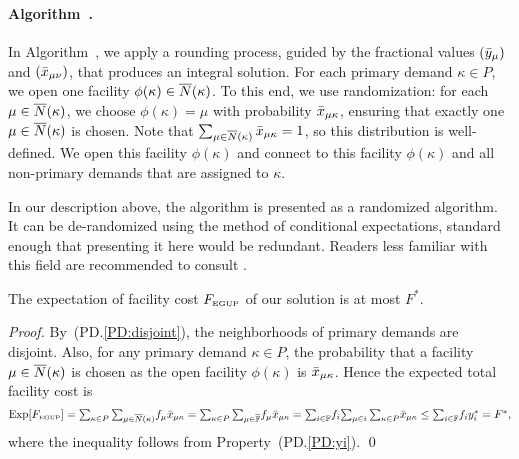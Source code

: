 \documentclass{llncs}
\begin{document}
\paragraph{Algorithm~{\EGUP.}}  In Algorithm~{\EGUP}, we apply a rounding
process, guided by the fractional values $({\bar y}_{\mu})$ and
$({\bar x}_{\mu\nu})$, that produces an integral solution.  For each
primary demand $\kappa\in P$, we open one facility $\phi(\kappa) \in
{\overline{N}}(\kappa)$. To this end, we use randomization: for each
$\mu\in{\overline{N}}(\kappa)$, we choose $\phi(\kappa) = \mu$ with
probability ${\bar x}_{\mu\kappa}$, ensuring that exactly one $\mu \in
{\overline{N}}(\kappa)$ is chosen. Note that
$\sum_{\mu\in{\overline{N}}(\kappa)}{\bar x}_{\mu\kappa}=1$, so this distribution
is well-defined.  We open this facility $\phi(\kappa)$ and connect to
this facility $\phi(\kappa)$ and all non-primary demands that are
assigned to $\kappa$.

In our description above, the algorithm is presented as a
randomized algorithm. It can be de-randomized using the
method of conditional expectations, standard enough that presenting it here would be
redundant. Readers less familiar with this field are
recommended to consult \cite{ChudakS04}.


\begin{lemma}\label{lemma:3fac}
  The expectation of facility cost $F_{\mbox{\tiny\rm EGUP}}$ of our solution is
  at most $F^\ast$.
\end{lemma}

\begin{proof}
  By~(PD.\ref{PD:disjoint}), the neighborhoods of primary
  demands are disjoint. Also, for any primary demand $\kappa\in P$,
  the probability that a facility $\mu\in{\overline{N}}(\kappa)$ is chosen as
  the open facility $\phi(\kappa)$ is ${\bar x}_{\mu\kappa}$. Hence the
  expected total facility cost is
%
\begin{equation*}
    \mbox{\rm Exp}[F_{\mbox{\tiny\rm EGUP}}]
	= \textstyle{\sum_{\kappa\in P}\sum_{\mu\in{\overline{N}}(\kappa)}} f_{\mu} {\bar x}_{\mu\kappa}
	= \textstyle{\sum_{\kappa\in P}\sum_{\mu\in\overline{\mathbb{F}}}} f_{\mu} {\bar x}_{\mu\kappa} 
	= \textstyle{\sum_{i\in\mathbb{F}}} f_i \textstyle{\sum_{\mu\in i}\sum_{\kappa\in P}} {\bar x}_{\mu\kappa} 
	\leq \textstyle{\sum_{i\in\mathbb{F}}} f_i y_i^\ast 
	= F^\ast,
\end{equation*}
%
where the inequality follows from Property~(PD.\ref{PD:yi}).
\qed
\end{proof}
\end{document}
